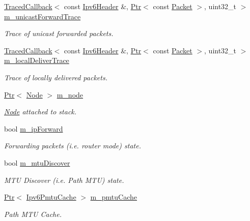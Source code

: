 \begin{DoxyCompactItemize}
\hyperlink{classns3_1_1TracedCallback}{Traced\+Callback}$<$ const \hyperlink{classns3_1_1Ipv6Header}{Ipv6\+Header} \&, \hyperlink{classns3_1_1Ptr}{Ptr}$<$ const \hyperlink{classns3_1_1Packet}{Packet} $>$, uint32\+\_\+t $>$ \hyperlink{classns3_1_1Ipv6L3Protocol_a76b5cbe054e52a240d3e1a3ea0f891fd}{m\+\_\+unicast\+Forward\+Trace}
\begin{DoxyCompactList}\small\item\em Trace of unicast forwarded packets. \end{DoxyCompactList}\item 
\hyperlink{classns3_1_1TracedCallback}{Traced\+Callback}$<$ const \hyperlink{classns3_1_1Ipv6Header}{Ipv6\+Header} \&, \hyperlink{classns3_1_1Ptr}{Ptr}$<$ const \hyperlink{classns3_1_1Packet}{Packet} $>$, uint32\+\_\+t $>$ \hyperlink{classns3_1_1Ipv6L3Protocol_afd8b2aef3c54456b509cdc7356db577e}{m\+\_\+local\+Deliver\+Trace}
\begin{DoxyCompactList}\small\item\em Trace of locally delivered packets. \end{DoxyCompactList}\item 
\hyperlink{classns3_1_1Ptr}{Ptr}$<$ \hyperlink{classns3_1_1Node}{Node} $>$ \hyperlink{classns3_1_1Ipv6L3Protocol_a543d8509395ee76de15d039ff1fce642}{m\+\_\+node}
\begin{DoxyCompactList}\small\item\em \hyperlink{classns3_1_1Node}{Node} attached to stack. \end{DoxyCompactList}\item 
bool \hyperlink{classns3_1_1Ipv6L3Protocol_a3dbdeac3cc4ec17f5a6ab9475fc8e7a8}{m\+\_\+ip\+Forward}
\begin{DoxyCompactList}\small\item\em Forwarding packets (i.\+e. router mode) state. \end{DoxyCompactList}\item 
bool \hyperlink{classns3_1_1Ipv6L3Protocol_a7b38ce20301ab4b5db712d45536d6e19}{m\+\_\+mtu\+Discover}
\begin{DoxyCompactList}\small\item\em M\+TU Discover (i.\+e. Path M\+TU) state. \end{DoxyCompactList}\item 
\hyperlink{classns3_1_1Ptr}{Ptr}$<$ \hyperlink{classns3_1_1Ipv6PmtuCache}{Ipv6\+Pmtu\+Cache} $>$ \hyperlink{classns3_1_1Ipv6L3Protocol_a03a839bfaf9ae8763a58a42e60b08ec5}{m\+\_\+pmtu\+Cache}
\begin{DoxyCompactList}\small\item\em Path M\+TU Cache. \end{DoxyCompactList}\item 

\end{DoxyCompactItemize}
